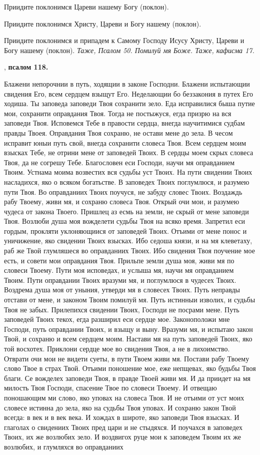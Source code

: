 Приидите поклонимся Цареви нашему Богу (поклон).

Приидите поклонимся Христу, Цареви и Богу нашему (поклон).

Приидите поклонимся и припадем к Самому Господу Исусу Христу, Цареви и Богу нашему (поклон). \itshape Таже, Псалом 50\normalfont{}. Помилуй мя Боже. \itshape Таже, кафисма 17\normalfont{}.


, \bfseries псалом 118\normalfont{}.


Блажени непорочнии в путь, ходящии в законе Господни. Блажени испытающии свидения Его, всем сердцем взыщут Его. Неделающии бо беззакония в путех Его ходиша. Ты заповеда заповеди Твоя сохранити зело. Еда исправилися быша путие мои, сохранити оправдания Твоя. Тогда не постыжуся, егда призрю на вся заповеди Твоя. Исповемся Тебе в правости сердца, внегда научитимися судбам правды Твоея. Оправдания Твоя сохраню, не остави мене до зела. В чесом исправит юныи путь свой, внегда сохранити словеса Твоя. Всем сердцем моим взысках Тебе, не отрини мене от заповедей Твоих. В сердцы моем скрых словеса Твоя, да не согрешу Тебе. Благословен еси Господи, научи мя оправданием Твоим. Устнама моима возвестих вся судьбы уст Твоих. На пути свидении Твоих насладихся, яко о всяком богатьстве. В заповедех Твоих поглумлюся, и разумею пути Твоя. Во оправданиих Твоих поучуся, не забуду словес Твоих. Воздаждь рабу Твоему, живи мя, и сохраню словеса Твоя. Открый очи мои, и разумею чудеса от закона Твоего. Пришлец аз есмь на земли, не скрый от мене заповеди Твоя. Возлюби душа моя вожделети судьбы Твоя на всяко время. Запретил еси гордым, прокляти уклоняющиися от заповедей Твоих. Отъими от мене понос и уничижение, яко свидении Твоих взысках. Ибо седоша князи, и на мя клеветаху, раб же Твой глумляшеся во оправданиих Твоих. Ибо свидения Твоя поучение мое есть, и совети мои оправдания Твоя. Прильпе земли душа моя, живи мя по словеси Твоему. Пути моя исповедах, и услыша мя, научи мя оправданием Твоим. Пути оправдании Твоих вразуми мя, и поглумлюся в чудесех Твоих. Воздрема душа моя от уныния, утверди мя в словесех Твоих. Путь неправды отстави от мене, и законом Твоим помилуй мя. Путь истинныи изволих, и судьбы Твоя не забых. Прилепихся свидении Твоих, Господи не посрами мене. Путь заповедей Твоих текох, егда разширил еси сердце мое. Законоположи мне Господи, путь оправдании Твоих, и взыщу и выну. Вразуми мя, и испытаю закон Твой, и сохраню и всем сердцем моим. Настави мя на путь заповедей Твоих, яко той восхотех. Приклони сердце мое во свидения Твоя, а не в лихоимство. Отврати очи мои не видети суеты, в пути Твоем живи мя. Постави рабу Твоему слово Твое в страх Твой. Отъими поношение мое, еже непщевах, яко будьбы Твоя благи. Се вожделех заповеди Твоя, в правде Твоей живи мя. И да приидет на мя милость Твоя Господи, спасение Твое по словеси Твоему. И отвещаю поношающим ми слово, яко уповах на словеса Твоя. И не отъими от уст моих словесе истинна до зела, яко на судьбы Твоя уповах. И сохраню закон Твой всегда: в век и в век века. И хождах в широте, яко заповеди Твоя взысках. И глаголах о свидениих Твоих пред цари и не стыдяхся. И поучахся в заповедех Твоих, их же возлюбих зело. И воздвигох руце мои к заповедем Твоим их же возлюбих, и глумляхся во оправданиих 